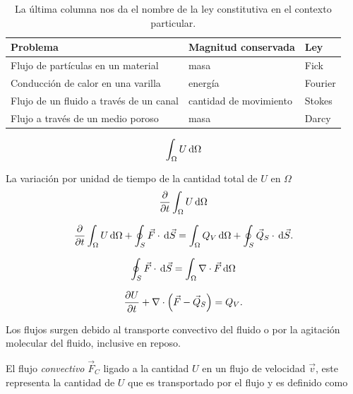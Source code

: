 \begin{table}[ht!]
	\centering
	\begin{tabular}{lll}
		\textbf{Problema}                       &
		\textbf{Magnitud conservada}            & \textbf{Ley} \\
		\hline
		Flujo de partículas en un material      &
		masa                                    & Fick         \\
		\hline
		Conducción de calor en una varilla      &
		energía                                 & Fourier      \\
		\hline
		Flujo de un fluido a través de un canal &
		cantidad de movimiento                  & Stokes       \\
		\hline
		Flujo a través de un medio poroso       &
		masa                                    & Darcy
	\end{tabular}
	\caption[short]{La última columna nos da el nombre de la ley
		constitutiva en el contexto particular.}
\end{table}

\begin{equation*}
	\int_{\Omega}
	U\dl\Omega
\end{equation*}

La variación por unidad de tiempo de la cantidad total de $U$ en $\Omega$
\begin{equation*}
	\diffp{}{t}
	\int_{\Omega}
	U\dl\Omega
\end{equation*}

\begin{equation}
	\diffp{}{t}
	\int_{\Omega}
	U\dl\Omega+
	\oint_{S}
	\vec{F}\cdot\dl{\vec{S}}=
	\int_{\Omega}
	Q_{V}\dl\Omega+
	\oint_{S}
	\vec{Q}_{S}\cdot\dl{\vec{S}}.
\end{equation}

\begin{equation*}
	\oint_{S}
	\vec{F}\cdot\dl{\vec{S}}=
	\int_{\Omega}
	\nabla\cdot\vec{F}\dl\Omega
\end{equation*}

\begin{equation*}
	\diffp{U}{t}+
	\nabla\cdot\left(\vec{F}-\vec{Q}_{S}\right)=
	Q_{V}.
\end{equation*}

Los flujos surgen debido al transporte convectivo del fluido o por la
agitación molecular del fluido, inclusive en reposo.

El flujo \emph{convectivo} $\vec{F}_{C}$ ligado a la cantidad $U$ en
un flujo de velocidad $\vec{v}$, este representa la cantidad de $U$
que es transportado por el flujo y es definido como


